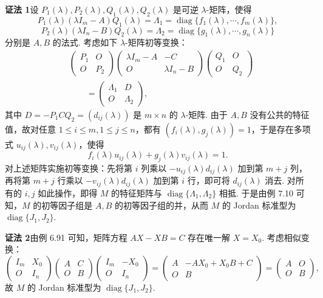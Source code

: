 \documentclass[UTF8,12pt,a4paper,fontset=fandol]{ctexart}
\begin{document}
\noindent\textbf{证法 1}\quad 设 $P_1(\lambda),P_2(\lambda),Q_1(\lambda),Q_2(\lambda)$ 是可逆 $\lambda$-矩阵，使得
\[
P_1(\lambda)(\lambda I_m-A)Q_1(\lambda)=\Lambda_1=\operatorname{diag}\{f_1(\lambda),\cdots,f_m(\lambda)\},
\]
\[
P_2(\lambda)(\lambda I_n-B)Q_2(\lambda)=\Lambda_2=\operatorname{diag}\{g_1(\lambda),\cdots,g_n(\lambda)\}
\]
分别是 $A,B$ 的法式. 考虑如下 $\lambda$-矩阵初等变换：
\[
\begin{aligned}
&\left(\begin{array}{cc}P_1&O\\O&P_2\end{array}\right)
\left(\begin{array}{cc}\lambda I_m-A&-C\\O&\lambda I_n-B\end{array}\right)
\left(\begin{array}{cc}Q_1&O\\O&Q_2\end{array}\right)\\
&\qquad =
\left(\begin{array}{cc}\Lambda_1&D\\O&\Lambda_2\end{array}\right),
\end{aligned}
\]
其中 $D=-P_1CQ_2=(d_{ij}(\lambda))$ 是 $m\times n$ 的 $\lambda$-矩阵. 由于 $A,B$ 没有公共的特征值，故对任意 $1\le i\le m,1\le j\le n$，都有 $(f_i(\lambda),g_j(\lambda))=1$，于是存在多项式 $u_{ij}(\lambda),v_{ij}(\lambda)$，使得
\[
f_i(\lambda)u_{ij}(\lambda)+g_j(\lambda)v_{ij}(\lambda)=1.
\]
对上述矩阵实施初等变换：先将第 $i$ 列乘以 $-u_{ij}(\lambda)d_{ij}(\lambda)$ 加到第 $m+j$ 列，再将第 $m+j$ 行乘以 $-v_{ij}(\lambda)d_{ij}(\lambda)$ 加到第 $i$ 行，即可将 $d_{ij}(\lambda)$ 消去. 对所有的 $i,j$ 如此操作，即得 $M$ 的特征矩阵与 $\operatorname{diag}\{\Lambda_1,\Lambda_2\}$ 相抵. 于是由例 7.10 可知，$M$ 的初等因子组是 $A,B$ 的初等因子组的并，从而 $M$ 的 Jordan 标准型为 $\operatorname{diag}\{J_1,J_2\}$.

\noindent\textbf{证法 2}\quad 由例 6.91 可知，矩阵方程 $AX-XB=C$ 存在唯一解 $X=X_0$. 考虑相似变换：
\[
\left(\begin{array}{cc}I_m&X_0\\O&I_n\end{array}\right)
\left(\begin{array}{cc}A&C\\O&B\end{array}\right)
\left(\begin{array}{cc}I_m&-X_0\\O&I_n\end{array}\right)
=\left(\begin{array}{cc}A&-AX_0+X_0B+C\\O&B\end{array}\right)
=\left(\begin{array}{cc}A&O\\O&B\end{array}\right),
\]
故 $M$ 的 Jordan 标准型为 $\operatorname{diag}\{J_1,J_2\}$.
\end{document}
